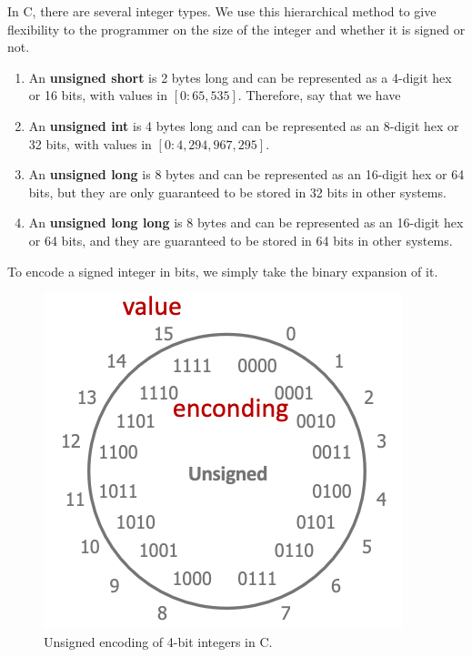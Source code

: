   \begin{definition}
    In C, there are several integer types. We use this hierarchical method to give flexibility to the programmer on the size of the integer and whether it is signed or not. 
    \begin{enumerate} 
      \item An \textbf{unsigned short} is 2 bytes long and can be represented as a 4-digit hex or 16 bits, with values in $[0:65,535]$. Therefore, say that we have 
      \item An \textbf{unsigned int} is 4 bytes long and can be represented as an 8-digit hex or 32 bits, with values in $[0:4,294,967,295]$. 
      \item An \textbf{unsigned long} is 8 bytes and can be represented as an 16-digit hex or 64 bits, but they are only guaranteed to be stored in 32 bits in other systems. 
      \item An \textbf{unsigned long long} is 8 bytes and can be represented as an 16-digit hex or 64 bits, and they are guaranteed to be stored in 64 bits in other systems. 
    \end{enumerate} 
  \end{definition}

  \begin{theorem}
    To encode a signed integer in bits, we simply take the binary expansion of it. 
    \begin{figure}[H]
      \centering 
      \includegraphics[scale=0.4]{img/unsigned_encoding.png}
      \caption{Unsigned encoding of 4-bit integers in C. } 
      \label{fig:unsigned_encoding}
    \end{figure}
  \end{theorem}

